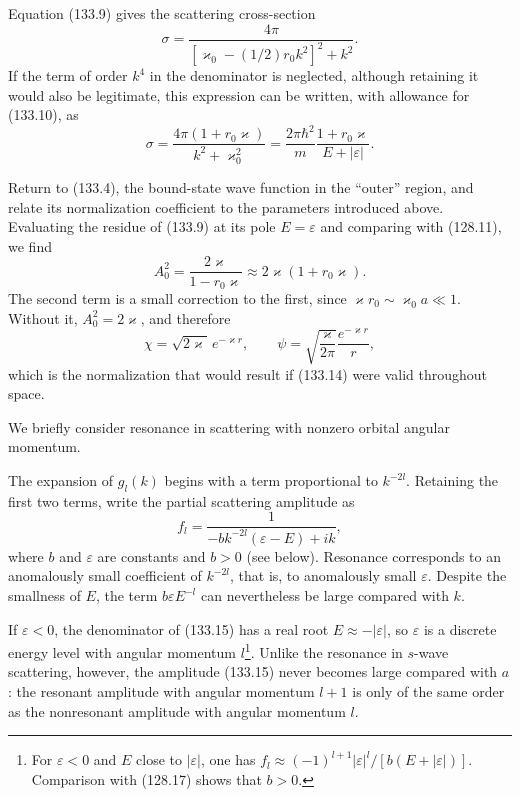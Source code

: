 Equation (133.9) gives the scattering cross-section
\[
 \sigma=\frac{4\pi}{[\varkappa_0-(1/2)r_0k^2]^2+k^2}.
\]
If the term of order $k^4$ in the denominator is neglected, although retaining it would also be legitimate, this expression can be written, with allowance for (133.10), as
\begin{equation}
 \sigma=\frac{4\pi(1+r_0\varkappa)}{k^2+\varkappa_0^2}
 =\frac{2\pi\hbar^2}{m}\frac{1+r_0\varkappa}{E+|\varepsilon|}.
 \tag{133.12}
\end{equation}

Return to (133.4), the bound-state wave function in the ``outer'' region, and relate its normalization coefficient to the parameters introduced above. Evaluating the residue of (133.9) at its pole $E=\varepsilon$ and comparing with (128.11), we find
\begin{equation}
 A_0^2=\frac{2\varkappa}{1-r_0\varkappa}\approx2\varkappa(1+r_0\varkappa).
 \tag{133.13}
\end{equation}
The second term is a small correction to the first, since $\varkappa r_0\sim\varkappa_0a\ll1$. Without it, $A_0^2=2\varkappa$, and therefore
\begin{equation}
 \chi=\sqrt{2\varkappa}\,e^{-\varkappa r},\qquad
 \psi=\sqrt{\frac{\varkappa}{2\pi}}\frac{e^{-\varkappa r}}r,
 \tag{133.14}
\end{equation}
which is the normalization that would result if (133.14) were valid throughout space.

We briefly consider resonance in scattering with nonzero orbital angular momentum.

The expansion of $g_l(k)$ begins with a term proportional to $k^{-2l}$. Retaining the first two terms, write the partial scattering amplitude as
\begin{equation}
 f_l=\frac1{-bk^{-2l}(\varepsilon-E)+ik},
 \tag{133.15}
\end{equation}
where $b$ and $\varepsilon$ are constants and $b>0$ (see below). Resonance corresponds to an anomalously small coefficient of $k^{-2l}$, that is, to anomalously small $\varepsilon$. Despite the smallness of $E$, the term $b\varepsilon E^{-l}$ can nevertheless be large compared with $k$.

If $\varepsilon<0$, the denominator of (133.15) has a real root $E\approx-|\varepsilon|$, so $\varepsilon$ is a discrete energy level with angular momentum $l$\footnote{For $\varepsilon<0$ and $E$ close to $|\varepsilon|$, one has $f_l\approx(-1)^{l+1}|\varepsilon|^l/[b(E+|\varepsilon|)]$. Comparison with (128.17) shows that $b>0$.}. Unlike the resonance in $s$-wave scattering, however, the amplitude (133.15) never becomes large compared with $a$: the resonant amplitude with angular momentum $l+1$ is only of the same order as the nonresonant amplitude with angular momentum $l$.

